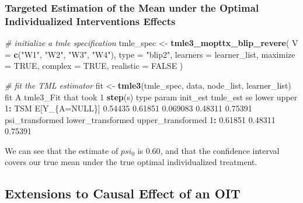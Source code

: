 \documentclass[12pt, krantz2,]{krantz}
\newenvironment{Shaded}{\begin{snugshade}}{\end{snugshade}}
\newcommand{\CommentTok}[1]{\textcolor[rgb]{0.37,0.37,0.37}{\textit{#1}}}
\newcommand{\DataTypeTok}[1]{\textcolor[rgb]{0.27,0.27,0.27}{#1}}
\newcommand{\DecValTok}[1]{\textcolor[rgb]{0.06,0.06,0.06}{#1}}
\newcommand{\FloatTok}[1]{\textcolor[rgb]{0.06,0.06,0.06}{#1}}
\newcommand{\KeywordTok}[1]{\textcolor[rgb]{0.27,0.27,0.27}{\textbf{#1}}}
\newcommand{\NormalTok}[1]{#1}
\newcommand{\OperatorTok}[1]{\textcolor[rgb]{0.43,0.43,0.43}{\textbf{#1}}}
\newcommand{\OtherTok}[1]{\textcolor[rgb]{0.37,0.37,0.37}{#1}}
\newcommand{\StringTok}[1]{\textcolor[rgb]{0.5,0.5,0.5}{#1}}
\theoremstyle{definition}
\theoremstyle{definition}
\theoremstyle{definition}
\newcommand{\1}{\mathbbm{1}}
\begin{document}
\hypertarget{targeted-estimation-of-the-mean-under-the-optimal-individualized-interventions-effects-1}{%
\subsubsection{Targeted Estimation of the Mean under the Optimal Individualized Interventions Effects}\label{targeted-estimation-of-the-mean-under-the-optimal-individualized-interventions-effects-1}}

\begin{Shaded}
\begin{Highlighting}[]
\CommentTok{# initialize a tmle specification}
\NormalTok{tmle_spec <-}\StringTok{ }\KeywordTok{tmle3_mopttx_blip_revere}\NormalTok{(}
  \DataTypeTok{V =} \KeywordTok{c}\NormalTok{(}\StringTok{"W1"}\NormalTok{, }\StringTok{"W2"}\NormalTok{, }\StringTok{"W3"}\NormalTok{, }\StringTok{"W4"}\NormalTok{), }\DataTypeTok{type =} \StringTok{"blip2"}\NormalTok{,}
  \DataTypeTok{learners =}\NormalTok{ learner_list, }\DataTypeTok{maximize =} \OtherTok{TRUE}\NormalTok{, }\DataTypeTok{complex =} \OtherTok{TRUE}\NormalTok{,}
  \DataTypeTok{realistic =} \OtherTok{FALSE}
\NormalTok{)}
\end{Highlighting}
\end{Shaded}

\begin{Shaded}
\begin{Highlighting}[]
\CommentTok{# fit the TML estimator}
\NormalTok{fit <-}\StringTok{ }\KeywordTok{tmle3}\NormalTok{(tmle_spec, data, node_list, learner_list)}
\NormalTok{fit}
\NormalTok{A tmle3_Fit that took }\DecValTok{1} \KeywordTok{step}\NormalTok{(s)}
\NormalTok{   type         param init_est tmle_est       se   lower   upper}
\DecValTok{1}\OperatorTok{:}\StringTok{  }\NormalTok{TSM E[Y_\{A=}\OtherTok{NULL}\NormalTok{\}]  }\FloatTok{0.54435}  \FloatTok{0.61851} \FloatTok{0.069083} \FloatTok{0.48311} \FloatTok{0.75391}
\NormalTok{   psi_transformed lower_transformed upper_transformed}
\DecValTok{1}\OperatorTok{:}\StringTok{         }\FloatTok{0.61851}           \FloatTok{0.48311}           \FloatTok{0.75391}
\end{Highlighting}
\end{Shaded}

We can see that the estimate of \(psi_0\) is \(0.60\), and that the confidence
interval covers our true mean under the true optimal individualized treatment.

\hypertarget{extensions-to-causal-effect-of-an-oit}{%
\subsection{Extensions to Causal Effect of an OIT}\label{extensions-to-causal-effect-of-an-oit}}
\end{document}
